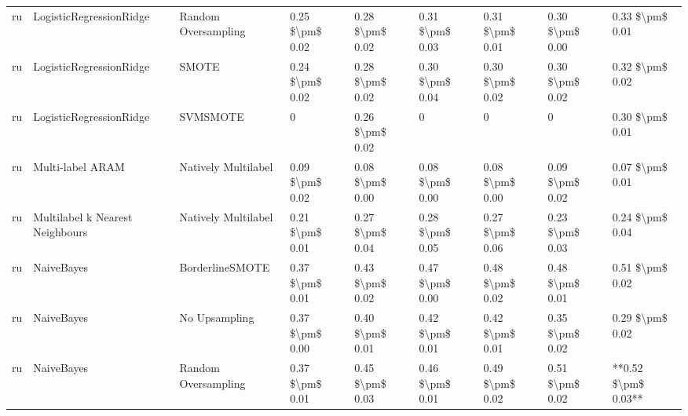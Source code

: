 \begin{tabular}{lllllllll}
      ru &         LogisticRegressionRidge &           Random Oversampling & 0.25 \$\textbackslash pm\$ 0.02 &           0.28 \$\textbackslash pm\$ 0.02 &       0.31 \$\textbackslash pm\$ 0.03 &        0.31 \$\textbackslash pm\$ 0.01 &                         0.30 \$\textbackslash pm\$ 0.00 &     0.33 \$\textbackslash pm\$ 0.01 \\
      ru &         LogisticRegressionRidge &                         SMOTE & 0.24 \$\textbackslash pm\$ 0.02 &           0.28 \$\textbackslash pm\$ 0.02 &       0.30 \$\textbackslash pm\$ 0.04 &        0.30 \$\textbackslash pm\$ 0.02 &                         0.30 \$\textbackslash pm\$ 0.02 &     0.32 \$\textbackslash pm\$ 0.02 \\
      ru &         LogisticRegressionRidge &                      SVMSMOTE &               0 &           0.26 \$\textbackslash pm\$ 0.02 &                     0 &                      0 &                                       0 &     0.30 \$\textbackslash pm\$ 0.01 \\
      ru &                Multi-label ARAM &           Natively Multilabel & 0.09 \$\textbackslash pm\$ 0.02 &           0.08 \$\textbackslash pm\$ 0.00 &       0.08 \$\textbackslash pm\$ 0.00 &        0.08 \$\textbackslash pm\$ 0.00 &                         0.09 \$\textbackslash pm\$ 0.02 &     0.07 \$\textbackslash pm\$ 0.01 \\
      ru & Multilabel k Nearest Neighbours &           Natively Multilabel & 0.21 \$\textbackslash pm\$ 0.01 &           0.27 \$\textbackslash pm\$ 0.04 &       0.28 \$\textbackslash pm\$ 0.05 &        0.27 \$\textbackslash pm\$ 0.06 &                         0.23 \$\textbackslash pm\$ 0.03 &     0.24 \$\textbackslash pm\$ 0.04 \\
      ru &                      NaiveBayes &               BorderlineSMOTE & 0.37 \$\textbackslash pm\$ 0.01 &           0.43 \$\textbackslash pm\$ 0.02 &       0.47 \$\textbackslash pm\$ 0.00 &        0.48 \$\textbackslash pm\$ 0.02 &                         0.48 \$\textbackslash pm\$ 0.01 &     0.51 \$\textbackslash pm\$ 0.02 \\
      ru &                      NaiveBayes &                 No Upsampling & 0.37 \$\textbackslash pm\$ 0.00 &           0.40 \$\textbackslash pm\$ 0.01 &       0.42 \$\textbackslash pm\$ 0.01 &        0.42 \$\textbackslash pm\$ 0.01 &                         0.35 \$\textbackslash pm\$ 0.02 &     0.29 \$\textbackslash pm\$ 0.02 \\
      ru &                      NaiveBayes &           Random Oversampling & 0.37 \$\textbackslash pm\$ 0.01 &           0.45 \$\textbackslash pm\$ 0.03 &       0.46 \$\textbackslash pm\$ 0.01 &        0.49 \$\textbackslash pm\$ 0.02 &                         0.51 \$\textbackslash pm\$ 0.02 & **0.52 \$\textbackslash pm\$ 0.03** \\

\end{tabular}
